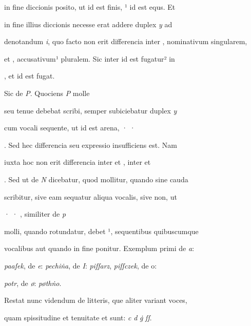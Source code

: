  in fine diccionis posito, ut  id est finis, ¹ id est equs. Et 

in fine illius diccionis  necesse erat addere duplex \textit{y} ad 

denotandum \textit{i}, quo facto non erit differencia inter , nominativum singularem, 

et , accusativum¹ pluralem. Sic inter  id est fugatur² in 

\splitlines
{}, et  id est fugat.

\indentK Sic de \textit{P}. Quociens \textit{P} molle 

\fulllines
seu tenue debebat scribi, semper subiciebatur duplex \textit{y} 

cum vocali sequente, ut  id est arena, · · 

. Sed hec differencia seu expressio insufficiens est. Nam 

iuxta hoc non erit differencia inter  et , inter  et 

. Sed ut de \textit{N} dicebatur, quod mollitur, quando sine cauda 

scribitur, sive eam sequatur aliqua vocalis, sive non, ut 

 · · , similiter de \textit{p} 

molli, quando rotundatur, debet ¹, sequentibus quibuscumque 

vocalibus aut quando in fine ponitur. Exemplum primi de \textit{a}: 

\textit{paaſek}, de \textit{e}: \textit{pechiṅa}, de \textit{I}: \textit{piſſarz}, \textit{piſſczek}, de o\textit{}: 

\textit{potr}, de \textit{ø}: \textit{pøthṅo}. 

\indentP Restat nunc videndum de litteris, que aliter variant voces,

\splitlines
quam spissitudine et tenuitate et sunt: \textit{c} \textit{d} \textit{ġ} \textit{ſſ}.

